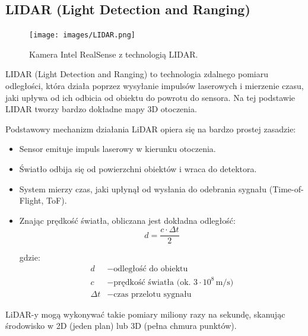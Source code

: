 \documentclass[magisterska]{pracadypl}
\begin{document}
\subsection{LIDAR (Light Detection and Ranging)}

\begin{figure}[H]  %
    \centering  %
    \texttt{[image: images/LIDAR.png]}  %
    \captionsetup{font=footnotesize}
    \caption[Kamera Intel RealSense L515 z technologią LIDAR. https://cell-kom.com/inne/21454-kamera-internetowa-full-hd-b16-1080p-5900217390350.html]{Kamera Intel RealSense z technologią LIDAR.}
    \label{fig:mono}  %
\end{figure}

LIDAR (Light Detection and Ranging) to technologia zdalnego pomiaru odległości, która działa poprzez wysyłanie impulsów laserowych i mierzenie czasu, jaki upływa od ich odbicia od obiektu do powrotu do sensora. Na tej podstawie LIDAR tworzy bardzo dokładne mapy 3D otoczenia.

Podstawowy mechanizm działania LiDAR opiera się na bardzo prostej zasadzie:

\begin{itemize}
  \item Sensor emituje impuls laserowy w kierunku otoczenia.
  \item Światło odbija się od powierzchni obiektów i wraca do detektora.
  \item System mierzy czas, jaki upłynął od wysłania do odebrania sygnału (Time-of-Flight, ToF).
  \item Znając prędkość światła, obliczana jest dokładna odległość:
    \[
    d = \frac{c \cdot \Delta t}{2}
    \]

  gdzie:
  \begin{align*}
  d &- \text{odległość do obiektu} \\
  c &- \text{prędkość światła (ok. } 3 \cdot 10^8 \, \text{m/s)} \\
  \Delta t &- \text{czas przelotu sygnału}
  \end{align*} 
\end{itemize}

LiDAR-y mogą wykonywać takie pomiary miliony razy na sekundę, skanując środowisko w 2D (jeden plan) lub 3D (pełna chmura punktów).
\end{document}
